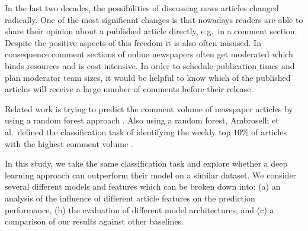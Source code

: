 In the last two decades, the possibilities of discussing news articles changed radically.
One of the most significant changes is that nowadays readers are able to share their opinion about a published article directly, e.g.\ in a comment section.
Despite the positive aspects of this freedom it is also often misused.
In consequence comment sections of online newspapers often get moderated which binds resources and is cost intensive.
In order to schedule publication times and plan moderator team sizes, it would be helpful to know which of the published articles will receive a large number of comments before their release.

Related work is trying to predict the comment volume of newspaper articles by using a random forest approach \cite{tsagkias2009predicting}.
Also using a random forest, Ambroselli et al.\ defined the classification task of identifying the weekly top $10\%$ of articles with the highest comment volume \cite{ambroselli2018prediction}.

In this study, we take the same classification task and explore whether a deep learning approach can outperform their model on a similar dataset.
We consider several different models and features which can be broken down into: (a) an analysis of the influence of different article features on the prediction performance, (b) the evaluation of different model architectures, and (c) a comparison of our results against other baselines.
